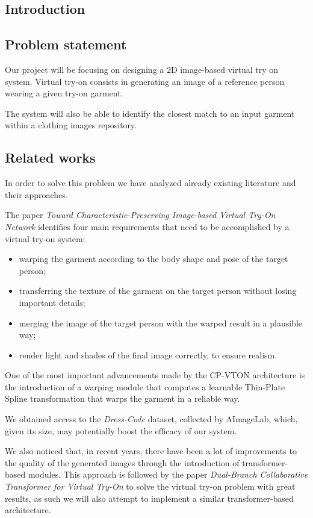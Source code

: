 \begin{multicols}{2}
\tableofcontents
\section{Introduction}

\subsection{Problem statement}

Our project will be focusing on designing a 2D image-based virtual try on system. Virtual try-on consists in generating an image of a reference person wearing a given try-on garment. 

The system will also be able to identify the closest match to an input garment within a clothing images repository.


\subsection{Related works}
In order to solve this problem we have analyzed already existing literature and their approaches.

The paper \textit{Toward Characteristic-Preserving Image-based Virtual Try-On Network}\cite{CP-VTON} identifies four main requirements that need to be accomplished by a virtual try-on system:
\begin{itemize}
\item warping the garment according to the body shape and pose of the target person; 
\item transferring the texture of the garment on the target person without losing important details; 
\item merging the image of the target person with the warped result in a plausible way; 
\item render light and shades of the final image correctly, to ensure realism.
\end{itemize}


One of the most important advancements made by the CP-VTON architecture is the introduction of a warping module that computes a learnable Thin-Plate Spline transformation that warps the garment in a reliable way.

We obtained access to the \textit{Dress-Code} dataset\cite{dress-code}, collected by AImageLab, which, given its size, may potentially boost the efficacy of our system.

We also noticed that, in recent years, there have been a lot of improvements to the quality of the generated images through the introduction of transformer-based modules. 
This approach is followed by the paper \textit{Dual-Branch Collaborative Transformer for Virtual Try-On}\cite{dual-branch} to solve the virtual try-on problem with great results, as such we will also attempt to implement a similar transformer-based architecture. 



\end{multicols}
